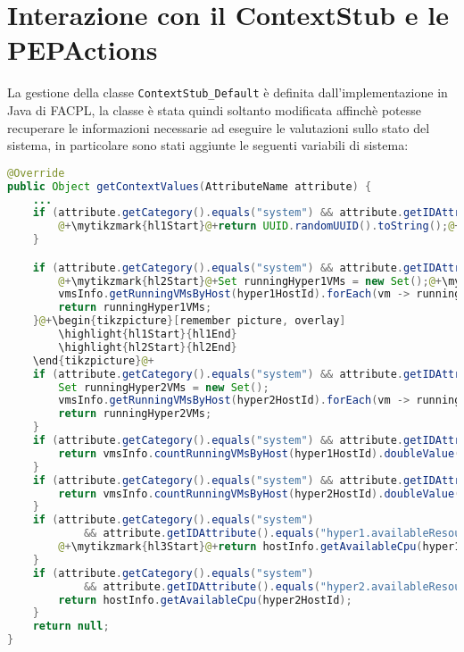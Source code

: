 \section{Interazione con il ContextStub e le PEPActions}
La gestione della classe \texttt{ContextStub\_Default} è definita dall'implementazione in Java di FACPL, la classe è stata quindi soltanto modificata affinchè potesse recuperare le informazioni necessarie ad eseguire le valutazioni sullo stato del sistema, in particolare sono stati aggiunte le seguenti variabili di sistema:
\begin{lstlisting}[language=Java, caption=Context di OpenNebula, label=code:ContextStubChoice, basicstyle=\fontsize{9}{13}\ttfamily]
@Override
public Object getContextValues(AttributeName attribute) {
    ...
    if (attribute.getCategory().equals("system") && attribute.getIDAttribute().equals("vm-name")) {
        @+\mytikzmark{hl1Start}@+return UUID.randomUUID().toString();@+\mytikzmark{hl1End}@+
    }

    if (attribute.getCategory().equals("system") && attribute.getIDAttribute().equals("hyper1.vm-names")) {
        @+\mytikzmark{hl2Start}@+Set runningHyper1VMs = new Set();@+\mytikzmark{hl2End}@+
        vmsInfo.getRunningVMsByHost(hyper1HostId).forEach(vm -> runningHyper1VMs.addValue(vm.getVmName()));
        return runningHyper1VMs;
    }@+\begin{tikzpicture}[remember picture, overlay]
        \highlight{hl1Start}{hl1End}
        \highlight{hl2Start}{hl2End}
    \end{tikzpicture}@+
    if (attribute.getCategory().equals("system") && attribute.getIDAttribute().equals("hyper2.vm-names")) {
        Set runningHyper2VMs = new Set();
        vmsInfo.getRunningVMsByHost(hyper2HostId).forEach(vm -> runningHyper2VMs.addValue(vm.getVmName()));
        return runningHyper2VMs;
    }
    if (attribute.getCategory().equals("system") && attribute.getIDAttribute().equals("hyper1.vm1-counter")) {
        return vmsInfo.countRunningVMsByHost(hyper1HostId).doubleValue();
    }
    if (attribute.getCategory().equals("system") && attribute.getIDAttribute().equals("hyper2.vm1-counter")) {
        return vmsInfo.countRunningVMsByHost(hyper2HostId).doubleValue();
    }
    if (attribute.getCategory().equals("system")
            && attribute.getIDAttribute().equals("hyper1.availableResources")) {
        @+\mytikzmark{hl3Start}@+return hostInfo.getAvailableCpu(hyper1HostId);@+\mytikzmark{hl3End}@+
    }
    if (attribute.getCategory().equals("system")
            && attribute.getIDAttribute().equals("hyper2.availableResources")) {
        return hostInfo.getAvailableCpu(hyper2HostId);
    }
    return null;
}
\end{lstlisting}
